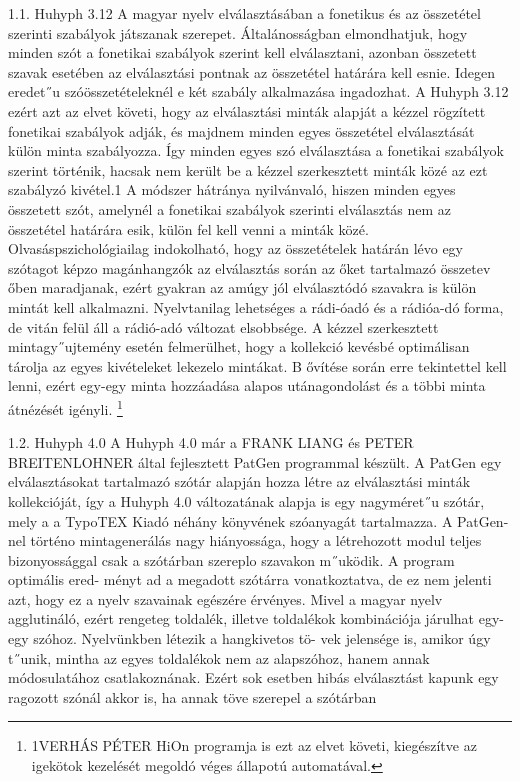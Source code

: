 \documentclass[11pt]{beamer}
\begin{document}
    \begin{frame}
        1.1. Huhyph 3.12
        A magyar nyelv elválasztásában a fonetikus és az összetétel szerinti szabályok játszanak
        szerepet.
        Általánosságban elmondhatjuk, hogy minden szót a fonetikai szabályok szerint
        kell elválasztani, azonban összetett szavak esetében az elválasztási pontnak az összetétel
        határára kell esnie.
        Idegen eredet˝u szóösszetételeknél e két szabály alkalmazása ingadozhat.
        A Huhyph 3.12 ezért azt az elvet követi, hogy az elválasztási minták alapját a kézzel rögzített fonetikai szabályok adják, és majdnem minden egyes összetétel elválasztását
        külön minta szabályozza.
        Így minden egyes szó elválasztása a fonetikai szabályok szerint
        történik, hacsak nem került be a kézzel szerkesztett minták közé az ezt szabályzó kivétel.1
        A módszer hátránya nyilvánvaló, hiszen minden egyes összetett szót, amelynél a fonetikai
        szabályok szerinti elválasztás nem az összetétel határára esik, külön fel kell venni a minták
        közé.
        Olvasáspszichológiailag indokolható, hogy az összetételek határán lévo egy szótagot
        képzo magánhangzók az elválasztás során az őket tartalmazó összetev őben maradjanak,
        ezért gyakran az amúgy jól elválasztódó szavakra is külön mintát kell alkalmazni.
        Nyelvtanilag lehetséges a rádi-óadó és a rádióa-dó forma, de vitán felül áll a rádió-adó változat
        elsobbsége.
        A kézzel szerkesztett mintagy˝ujtemény esetén felmerülhet, hogy a kollekció kevésbé
        optimálisan tárolja az egyes kivételeket lekezelo mintákat.
        B ővítése során erre tekintettel
        kell lenni, ezért egy-egy minta hozzáadása alapos utánagondolást és a többi minta átnézését
        igényli.
        \footnote{1VERHÁS PÉTER HiOn programja is ezt az elvet követi, kiegészítve az igekötok kezelését megoldó véges
        állapotú automatával.}
    \end{frame}

    \begin{frame}
        1.2. Huhyph 4.0
        A Huhyph 4.0 már a FRANK LIANG és PETER BREITENLOHNER által fejlesztett PatGen
        programmal készült.
        A PatGen egy elválasztásokat tartalmazó szótár alapján hozza létre az
        elválasztási minták kollekcióját, így a Huhyph 4.0 változatának alapja is egy nagyméret˝u
        szótár, mely a a TypoTEX Kiadó néhány könyvének szóanyagát tartalmazza.
        A PatGen-nel történo mintagenerálás nagy hiányossága, hogy a létrehozott modul teljes
        bizonyossággal csak a szótárban szereplo szavakon m˝uködik. A program optimális ered-
        ményt ad a megadott szótárra vonatkoztatva, de ez nem jelenti azt, hogy ez a nyelv szavainak egészére érvényes. Mivel a magyar nyelv agglutináló, ezért rengeteg toldalék, illetve
        toldalékok kombinációja járulhat egy-egy szóhoz. Nyelvünkben létezik a hangkivetos tö-
        vek jelensége is, amikor úgy t˝unik, mintha az egyes toldalékok nem az alapszóhoz, hanem
        annak módosulatához csatlakoznának. Ezért sok esetben hibás elválasztást kapunk egy ragozott szónál akkor is, ha annak töve szerepel a szótárban
    \end{frame}
\end{document}
